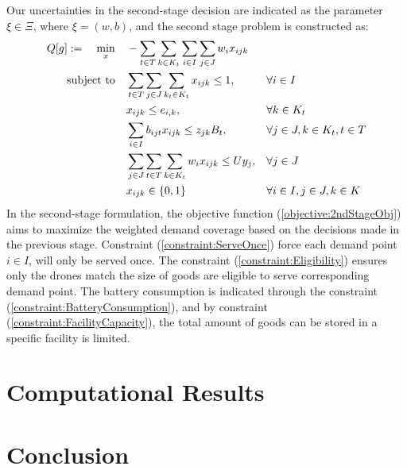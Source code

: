 \documentclass[preprint,review,11pt,authoryear]{elsarticle}
\begin{document}
Our uncertainties in the second-stage decision are indicated as the parameter $\xi \in \Xi$, where $\xi = \left( w, b \right)$, and the second stage problem is constructed as:
\begin{subequations}
    \begin{align}
        Q[g] :=  \quad \min \limits_{x} \quad &  - \sum_{t \in T} \sum_{k \in K_t} \sum_{i \in I} \sum_{j \in J} w_i x_{ijk} & & \label{objective:2ndStageObj} \\
                             \operatorname{subject~to} \quad & \sum_{t\in T} \sum_{j\in J} \sum_{k_t\in K_t} x_{ijk} \leq 1,        & & \forall i\in I \label{constraint:ServeOnce} \\
                                              & x_{ijk} \leq e_{i,k},                                                & & \forall k\in K_t \label{constraint:Eligibility} \\
                                              & \sum_{i\in I} b_{ijt} x_{ijk} \leq z_{jk} B_{t},                     & & \forall j\in J, k\in K_t, t \in T \label{constraint:BatteryConsumption} \\
                                              & \sum_{j\in J} \sum_{t\in T} \sum_{k\in K_t} w_i x_{ijk}  \leq U y_j, & & \forall j\in J \label{constraint:FacilityCapacity} \\
                                              & x_{ijk} \in \{0,1\}                                                  & & \forall i \in I, j\in J, k\in K \label{constraint:2ndStageBinary}
    \end{align}
\end{subequations}
In the second-stage formulation, the objective function (\ref{objective:2ndStageObj}) aims to maximize the weighted demand coverage based on the decisions made in the previous stage. Constraint (\ref{constraint:ServeOnce}) force each demand point $i \in I$, will only be served once. The constraint (\ref{constraint:Eligibility}) ensures only the drones match the size of goods are eligible to serve corresponding demand point. The battery consumption is indicated through the constraint (\ref{constraint:BatteryConsumption}), and by constraint (\ref{constraint:FacilityCapacity}), the total amount of goods can be stored in a specific facility is limited. 

\section{Computational Results}\label{sec:results}


\section{Conclusion}



\newpage


\end{document}
